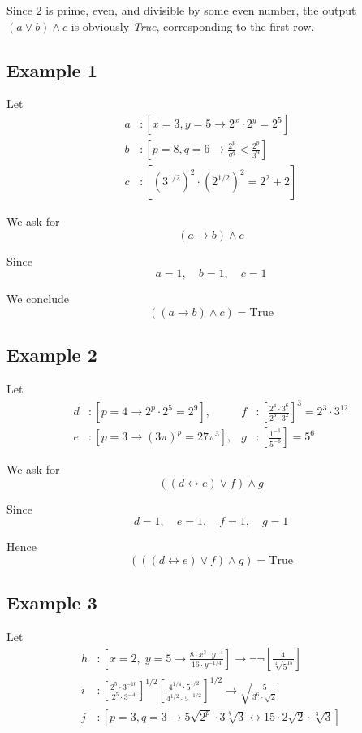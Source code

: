 \documentclass[12pt,a4paper,openany]{article}
\begin{document}
Since \(2\) is prime, even, and divisible by some even number, the output
\((a \lor b) \land c\) is obviously \emph{True}, corresponding to the first row.

\subsection{Example 1}\label{example-1}

Let
\[
\begin{aligned}
a &: \left[x = 3, y = 5 \to 2^x \cdot 2^y = 2^5\right] \\
b &: \left[p = 8, q = 6 \to \frac{2^p}{q^q} < \frac{2^p}{3^9}\right] \\
c &: \left[\left(3^{1/2}\right)^2 \cdot \left(2^{1/2}\right)^2 = 2^2 + 2 \right]
\end{aligned}
\]

We ask for
\[
(a \to b) \land c
\]

Since
\[
a = 1, \quad b = 1, \quad c = 1
\]

We conclude
\[
\boxed{((a \to b) \land c) = \text{True}}
\]

\subsection{Example 2}\label{example-2}

Let
\[
\begin{aligned}
d &: \left[p=4 \to 2^p \cdot 2^5 = 2^9\right], & 
f &: \left[\frac{2^4 \cdot 3^6}{2^3 \cdot 3^2}\right]^3 = 2^3 \cdot 3^{12} \\
e &: \left[p=3 \to (3\pi)^p = 27\pi^3\right], &
g &: \left[\frac{1^{-1}}{5^{-6}}\right] = 5^6
\end{aligned}
\]

We ask for
\[
((d \leftrightarrow e) \lor f) \land g
\]

Since
\[
d = 1, \quad e = 1, \quad f = 1, \quad g = 1
\]

Hence
\[
\boxed{(((d \leftrightarrow e) \lor f) \land g) = \text{True}}
\]

\subsection{Example 3}\label{example-3}

Let
\[
\begin{aligned}
h &: \left[ x=2, \; y=5 \to \frac{8 \cdot x^3 \cdot y^{-4}}{16 \cdot y^{-1/4}}\right] \to \neg \neg \left[\frac{4}{\sqrt[4]{5^{15}}}\right] \\
i &: \left[\frac{2^5 \cdot 3^{-10}}{2^5 \cdot 3^{-4}}\right]^{1/2} \left[\frac{4^{1/4} \cdot 5^{1/2}}{4^{1/2} \cdot 5^{-1/2}}\right]^{1/2} \to \sqrt{\frac{5}{3^6 \cdot \sqrt{2}}} \\
j &: \left[p=3, q=3 \to 5 \sqrt{2^p} \cdot 3 \sqrt[q]{3} \leftrightarrow 15 \cdot 2 \sqrt{2} \cdot \sqrt[3]{3}\right]
\end{aligned}
\]
\end{document}
